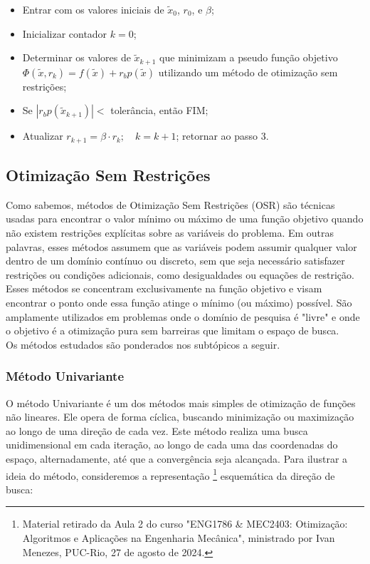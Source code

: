 \documentclass[a4paper, 12pt]{article}
\begin{document}
\begin{itemize}
    \item Entrar com os valores iniciais de $\tilde{x}_0$, $r_0$, e $\beta$;
    \item Inicializar contador $k=0$;
    \item Determinar os valores de $\tilde{x}_{k+1}$ que minimizam a pseudo função objetivo $\Phi(\tilde{x}, r_k) = f(\tilde{x}) + r_b p(\tilde{x})$ utilizando um método de otimização sem restrições;
    \item Se $\left| r_b p(\tilde{x}_{k+1}) \right| <$ tolerância, então FIM;
    \item Atualizar $r_{k+1} = \beta \cdot r_k; \quad k = k+1$; retornar ao passo 3.
\end{itemize}



\subsection{Otimização Sem Restrições}

Como sabemos, métodos de Otimização Sem Restrições (OSR) são técnicas usadas para encontrar o valor mínimo ou máximo de uma função objetivo quando não existem restrições explícitas sobre as variáveis do problema. Em outras palavras, esses métodos assumem que as variáveis podem assumir qualquer valor dentro de um domínio contínuo ou discreto, sem que seja necessário satisfazer restrições ou condições adicionais, como desigualdades ou equações de restrição.\\

Esses métodos se concentram exclusivamente na função objetivo e visam encontrar o ponto onde essa função atinge o mínimo (ou máximo) possível. São amplamente utilizados em problemas onde o domínio de pesquisa é "livre" e onde o objetivo é a otimização pura sem barreiras que limitam o espaço de busca.\\

Os métodos estudados são ponderados nos subtópicos a seguir.

\subsubsection{Método Univariante}

O método Univariante é um dos métodos mais simples de otimização de funções não lineares. Ele opera de forma cíclica, buscando minimização ou maximização ao longo de uma direção de cada vez. Este método realiza uma busca unidimensional em cada iteração, ao longo de cada uma das coordenadas do espaço, alternadamente, até que a convergência seja alcançada. Para ilustrar a ideia do método, consideremos a representação \footnote{Material retirado da Aula 2 do curso "ENG1786 & MEC2403: Otimização: Algoritmos e Aplicações na Engenharia Mecânica", ministrado por Ivan Menezes, PUC-Rio, 27 de agosto de 2024.} esquemática da direção de busca:
\end{document}
